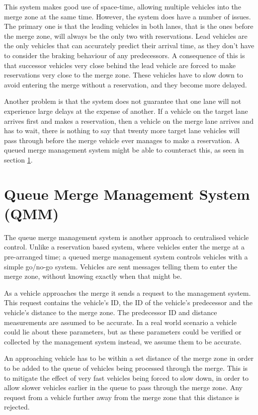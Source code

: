 This system makes good use of space-time, allowing multiple vehicles into the merge zone at the same time. However, the system does have a number of issues. The primary one is that the leading vehicles in both lanes, that is the ones before the merge zone, will always be the only two with reservations. Lead vehicles are the only vehicles that can accurately predict their arrival time, as they don't have to consider the braking behaviour of any predecessors. A consequence of this is that successor vehicles very close behind the lead vehicle are forced to make reservations very close to the merge zone. These vehicles have to slow down to avoid entering the merge without a reservation, and they become more delayed.

Another problem is that the system does not guarantee that one lane will not experience large delays at the expense of another. If a vehicle on the target lane arrives first and makes a reservation, then a vehicle on the merge lane arrives and has to wait, there is nothing to say that twenty more target lane vehicles will pass through before the merge vehicle ever manages to make a reservation. A queued merge management system might be able to counteract this, as seen in section \ref{sec:Queue Merge Management System}.

\section{Queue Merge Management System (QMM)}
\label{sec:Queue Merge Management System}
The queue merge management system is another approach to centralised vehicle control. Unlike a reservation based system, where vehicles enter the merge at a pre-arranged time; a queued merge management system controls vehicles with a simple go/no-go system. Vehicles are sent messages telling them to enter the merge zone, without knowing exactly when that might be.

As a vehicle approaches the merge it sends a request to the management system. This request contains the vehicle's ID, the ID of the vehicle's predecessor and the vehicle's distance to the merge zone. The predecessor ID and distance measurements are assumed to be accurate. In a real world scenario a vehicle could lie about these parameters, but as these parameters could be verified or collected by the management system instead, we assume them to be accurate.

An approaching vehicle has to be within a set distance of the merge zone in order to be added to the queue of vehicles being processed through the merge. This is to mitigate the effect of very fast vehicles being forced to slow down, in order to allow slower vehicles earlier in the queue to pass through the merge zone. Any request from a vehicle further away from the merge zone that this distance is rejected.

